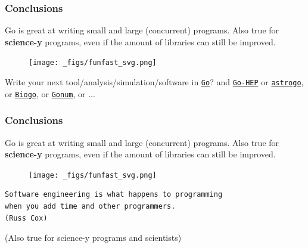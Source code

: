 \documentclass[9pt]{beamer}
\newcommand{\myblue} [1] {{\color{blue}#1}}
\begin{document}
\begin{frame}[fragile]
\frametitle{Conclusions}


Go is great at writing small and large (concurrent) programs.
Also true for \textbf{science-y} programs, even if the amount of libraries can still be improved.


\begin{figure}[h]
\begin{center}
\texttt{[image: \_figs/funfast\_svg.png]}
\end{center}

\end{figure}

Write your next tool/analysis/simulation/software in \myblue{\href{https://golang.org/}{\texttt{Go}}}? and \myblue{\href{https://go-hep.org}{\texttt{Go-HEP}}} or \myblue{\href{https://github.com/astrogo}{\texttt{astrogo}}}, or \myblue{\href{https://github.com/biogo}{\texttt{Biogo}}}, or \myblue{\href{https://gonum.org}{\texttt{Gonum}}}, or ...



\end{frame}

\begin{frame}[fragile]
\frametitle{Conclusions}


Go is great at writing small and large (concurrent) programs.
Also true for \textbf{science-y} programs, even if the amount of libraries can still be improved.


\begin{figure}[h]
\begin{center}
\texttt{[image: \_figs/funfast\_svg.png]}
\end{center}
\end{figure}


	\begin{block}{}
\begin{verbatim}
Software engineering is what happens to programming
when you add time and other programmers.
(Russ Cox)
\end{verbatim}

		(Also true for science-y programs and scientists)
	\end{block}{}


\end{frame}
\end{document}
